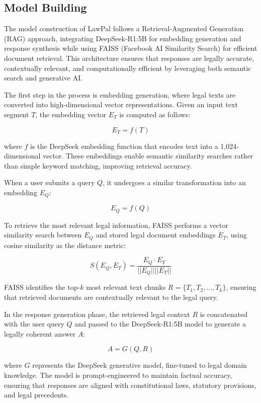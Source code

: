 \subsection{Model Building}

The model construction of LawPal follows a Retrieval-Augmented Generation (RAG) approach, integrating DeepSeek-R1:5B for embedding generation and response synthesis while using FAISS (Facebook AI Similarity Search) for efficient document retrieval. This architecture ensures that responses are legally accurate, contextually relevant, and computationally efficient by leveraging both semantic search and generative AI.  

The first step in the process is embedding generation, where legal texts are converted into high-dimensional vector representations. Given an input text segment \( T \), the embedding vector \( E_T \) is computed as follows:  

\[
E_T = f(T)
\]

where \( f \) is the DeepSeek embedding function that encodes text into a 1,024-dimensional vector. These embeddings enable semantic similarity searches rather than simple keyword matching, improving retrieval accuracy.  

When a user submits a query \( Q \), it undergoes a similar transformation into an embedding \( E_Q \):  

\[
E_Q = f(Q)
\]

To retrieve the most relevant legal information, FAISS performs a vector similarity search between \( E_Q \) and stored legal document embeddings \( E_T \), using cosine similarity as the distance metric:  

\[
S(E_Q, E_T) = \frac{E_Q \cdot E_T}{||E_Q|| ||E_T||}
\]

FAISS identifies the top-\( k \) most relevant text chunks \( R = \{T_1, T_2, ..., T_k\} \), ensuring that retrieved documents are contextually relevant to the legal query.  

In the response generation phase, the retrieved legal context \( R \) is concatenated with the user query \( Q \) and passed to the DeepSeek-R1:5B model to generate a legally coherent answer \( A \):  

\[
A = G(Q, R)
\]

where \( G \) represents the DeepSeek generative model, fine-tuned to legal domain knowledge. The model is prompt-engineered to maintain factual accuracy, ensuring that responses are aligned with constitutional laws, statutory provisions, and legal precedents.  

